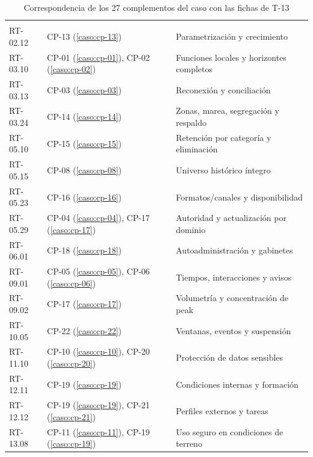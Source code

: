 \begin{longtable}{L{.17\textwidth}L{.31\textwidth}L{.42\textwidth}}
\caption{Correspondencia de los 27 complementos del caso con las fichas de T-13}\label{tab:t13-complementos}\\\hline
{} &  & \\\hline\endfirsthead
\hline{} &  & \\\hline\endhead
RT-02.12 & CP-13 (\ref{caso:cp-13}) & Parametrización y crecimiento\\\hline
RT-03.10 & CP-01 (\ref{caso:cp-01}), CP-02 (\ref{caso:cp-02}) & Funciones locales y horizontes completos\\\hline
RT-03.13 & CP-03 (\ref{caso:cp-03}) & Reconexión y conciliación\\\hline
RT-03.24 & CP-14 (\ref{caso:cp-14}) & Zonas, marea, segregación y respaldo\\\hline
RT-05.10 & CP-15 (\ref{caso:cp-15}) & Retención por categoría y eliminación\\\hline
RT-05.15 & CP-08 (\ref{caso:cp-08}) & Universo histórico íntegro\\\hline
RT-05.23 & CP-16 (\ref{caso:cp-16}) & Formatos/canales y disponibilidad\\\hline
RT-05.29 & CP-04 (\ref{caso:cp-04}), CP-17 (\ref{caso:cp-17}) & Autoridad y actualización por dominio\\\hline
RT-06.01 & CP-18 (\ref{caso:cp-18}) & Autoadministración y gabinetes\\\hline
RT-09.01 & CP-05 (\ref{caso:cp-05}), CP-06 (\ref{caso:cp-06}) & Tiempos, interacciones y avisos\\\hline
RT-09.02 & CP-17 (\ref{caso:cp-17}) & Volumetría y concentración de peak\\\hline
RT-10.05 & CP-22 (\ref{caso:cp-22}) & Ventanas, eventos y suspensión\\\hline
RT-11.10 & CP-10 (\ref{caso:cp-10}), CP-20 (\ref{caso:cp-20}) & Protección de datos sensibles\\\hline
RT-12.11 & CP-19 (\ref{caso:cp-19}) & Condiciones internas y formación\\\hline
RT-12.12 & CP-19 (\ref{caso:cp-19}), CP-21 (\ref{caso:cp-21}) & Perfiles externos y tareas\\\hline
RT-13.08 & CP-11 (\ref{caso:cp-11}), CP-19 (\ref{caso:cp-19}) & Uso seguro en condiciones de terreno\\\hline

\end{longtable}
